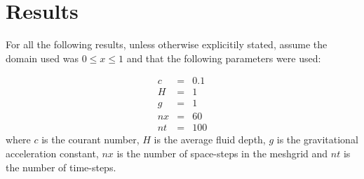 \documentclass[a4paper,12pt, notitlepage]{article}
\begin{document}
\section{Results}\label{results section}
For all the following results, unless otherwise explicitily stated, assume the domain used was $0 \leq x \leq 1$ and that the following parameters were used:

\begin{eqnarray}
c & = & 0.1\\
H & = & 1\\
g & = & 1\\
nx & = & 60\\
nt & = & 100
\end{eqnarray}
where $c$ is the courant number, $H$ is the average fluid depth, $g$ is the gravitational acceleration constant, $nx$ is the number of space-steps in the meshgrid and $nt$ is the number of time-steps.
\end{document}
